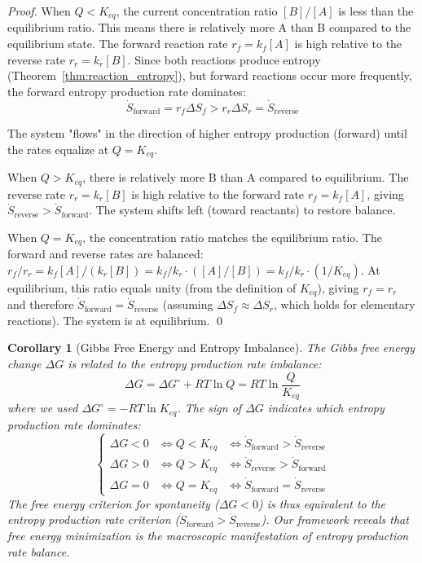 \documentclass[12pt,a4paper]{article}
\newtheorem{corollary}[theorem]{Corollary}
\theoremstyle{definition}
\theoremstyle{remark}
\begin{document}
\begin{proof}
When $Q < K_{eq}$, the current concentration ratio $[B]/[A]$ is less than the equilibrium ratio. This means there is relatively more A than B compared to the equilibrium state. The forward reaction rate $r_f = k_f [A]$ is high relative to the reverse rate $r_r = k_r [B]$. Since both reactions produce entropy (Theorem~\ref{thm:reaction_entropy}), but forward reactions occur more frequently, the forward entropy production rate dominates:
\begin{equation}
\dot{S}_{\text{forward}} = r_f \Delta S_f > r_r \Delta S_r = \dot{S}_{\text{reverse}}
\end{equation}

The system "flows" in the direction of higher entropy production (forward) until the rates equalize at $Q = K_{eq}$.

When $Q > K_{eq}$, there is relatively more B than A compared to equilibrium. The reverse rate $r_r = k_r [B]$ is high relative to the forward rate $r_f = k_f [A]$, giving $\dot{S}_{\text{reverse}} > \dot{S}_{\text{forward}}$. The system shifts left (toward reactants) to restore balance.

When $Q = K_{eq}$, the concentration ratio matches the equilibrium ratio. The forward and reverse rates are balanced: $r_f / r_r = k_f [A] / (k_r [B]) = k_f / k_r \cdot ([A]/[B]) = k_f / k_r \cdot (1/K_{eq})$. At equilibrium, this ratio equals unity (from the definition of $K_{eq}$), giving $r_f = r_r$ and therefore $\dot{S}_{\text{forward}} = \dot{S}_{\text{reverse}}$ (assuming $\Delta S_f \approx \Delta S_r$, which holds for elementary reactions). The system is at equilibrium. \qed
\end{proof}

\begin{corollary}[Gibbs Free Energy and Entropy Imbalance]
\label{cor:gibbs_entropy}
The Gibbs free energy change $\Delta G$ is related to the entropy production rate imbalance:
\begin{equation}
\Delta G = \Delta G^\circ + RT \ln Q = RT \ln \frac{Q}{K_{eq}}
\end{equation}
where we used $\Delta G^\circ = -RT \ln K_{eq}$. The sign of $\Delta G$ indicates which entropy production rate dominates:
\begin{equation}
\begin{cases}
\Delta G < 0 & \iff Q < K_{eq} & \iff \dot{S}_{\text{forward}} > \dot{S}_{\text{reverse}} \\
\Delta G > 0 & \iff Q > K_{eq} & \iff \dot{S}_{\text{reverse}} > \dot{S}_{\text{forward}} \\
\Delta G = 0 & \iff Q = K_{eq} & \iff \dot{S}_{\text{forward}} = \dot{S}_{\text{reverse}}
\end{cases}
\end{equation}
The free energy criterion for spontaneity ($\Delta G < 0$) is thus equivalent to the entropy production rate criterion ($\dot{S}_{\text{forward}} > \dot{S}_{\text{reverse}}$). Our framework reveals that free energy minimization is the macroscopic manifestation of entropy production rate balance.
\end{corollary}
\end{document}
